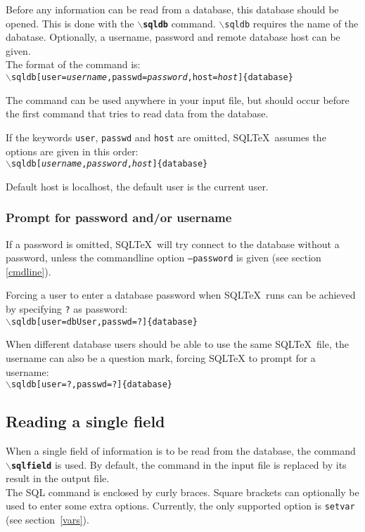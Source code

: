 \documentclass{article}
\newcommand{\bs}{\ensuremath{\backslash}}
\newcommand{\vs}{\vspace{3mm}}
\begin{document}
Before any information can be read from a database, this database should be opened.
This is done with the \texttt{\textbf{\bs sqldb}} command.
\texttt{\bs sqldb} requires the name of the dabatase. Optionally, a username, password and remote database host can be given. \\
The format of the command is:\\
\texttt{\bs sqldb[user=\textit{username},passwd=\textit{password},host=\textit{host}]\{database\}}

The command can be used anywhere in your input file, but should occur before the first command that tries to
read data from the database.

\vs

If the keywords \texttt{user}, \texttt{passwd} and \texttt{host} are omitted, SQL\TeX\ assumes the options are given in
this order:\\
\texttt{\bs sqldb[\textit{username},\textit{password},\textit{host}]\{database\}}

Default host is localhost, the default user is the current user.

\subsubsection{Prompt for password and/or username}

If a password is omitted, SQL\TeX\ will try connect to the database without a password, unless the commandline option \texttt{--password} is given (see section \ref{cmdline}).

\vs 

Forcing a user to enter a database password when SQL\TeX\ runs can be achieved by specifying \texttt{?} as password:\\
\texttt{\bs sqldb[user=dbUser,passwd=?]\{database\}}

\vs

When different database users should be able to use the same SQL\TeX\ file, the username can also be a question mark, forcing SQL\TeX
to prompt for a username:\\
\texttt{\bs sqldb[user=?,passwd=?]\{database\}}

\subsection{Reading a single field}\label{sqlfield}

When a single field of information is to be read from the database, the command \texttt{\textbf{\bs sqlfield}}
is used. By default, the command in the input file is replaced by its result in the output file.\\
The SQL command is enclosed by curly braces. Square brackets can optionally be used to enter some extra options.
Currently, the only supported option is \texttt{setvar} (see section~\ref{vars}).
\end{document}
